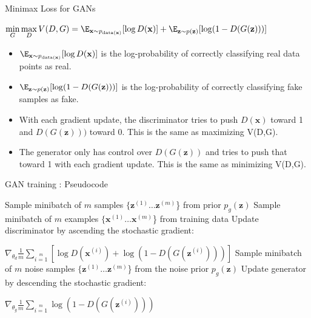 \begin{frame} {Minimax Loss for GANs}
  \begin{tcolorbox}
    $\min \limits_G \max \limits_D V(D,G) = \E_{\mathbf{x}\sim p_{\text{data}(\mathbf{x})}}[\log D(\mathbf{x})] + \E_{\mathbf{z}\sim p(\mathbf{z})}[\log (1 - D(G(\mathbf{z})))]$
  \end{tcolorbox}
  \begin{itemize}
    \item $\E_{\mathbf{x}\sim p_{\text{data}(\mathbf{x})}}[\log D(\mathbf{x})]$ is the log-probability of correctly classifying real data points as real. 
  \vspace{2mm}
    \item $\E_{\mathbf{z}\sim p(\mathbf{z})}[\log (1 - D(G(\mathbf{z})))]$ is the log-probability of correctly classifying fake samples as fake.
  \vspace{2mm}
    \item With each gradient update, the discriminator tries to push $D(\mathbf{x})$ toward 1 and $D(G(\mathbf{z})))$ toward 0. This is the same as maximizing V(D,G).
  \vspace{2mm}
    \item The generator  only has control over $D(G(\mathbf{z}))$ and tries to push that toward 1 with each gradient update. This is the same as minimizing V(D,G).
  \end{itemize}
\end{frame}

\begin{frame} {GAN training : Pseudocode}
  \begin{algorithm}[H]
  \footnotesize
    \caption{Minibatch stochastic gradient descent training of GANs. Amount of training iterations, amount of discriminator updates $k$ }
    \begin{algorithmic}[1]
          \State Sample minibatch of $m$ samples $\{\mathbf{z}^{(1)} \ldots \mathbf{z}^{(m)}$\} from  prior $p_g(\mathbf{z})$
          \State Sample minibatch of $m$ examples $\{\mathbf{x}^{(1)} \ldots \mathbf{x}^{(m)}$\} from  training data 
          \State Update discriminator by ascending the stochastic gradient: \item[]
  \hspace{2.5 cm}          $\nabla_{{\theta}_d} \frac {1}{m} \sum \limits_{i=1} \limits^{m} \left [ \log D(\mathbf{x}^{(i)}) + \log (1 - D(G(\mathbf{z}^{(i)}))) \right]$
        \EndFor
        \State Sample minibatch of $m$ noise samples $\{\mathbf{z}^{(1)} \ldots \mathbf{z}^{(m)}$\} from the noise prior $p_g(\mathbf{z})$
        \State Update generator by descending the stochastic gradient: \item[]
   \hspace{2.5 cm}       $\nabla_{{\theta}_g} \frac {1}{m} \sum \limits_{i=1} \limits^{m} \log (1 - D(G(\mathbf{z}^{(i)})))$
      \EndFor
    \end{algorithmic}
  \end{algorithm}
\end{frame}


